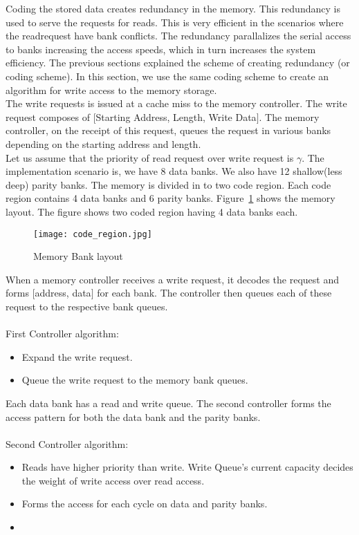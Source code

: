 Coding the stored data creates redundancy in the memory. This redundancy is used to serve the requests for reads. This is very efficient in the scenarios where the readrequest have bank conflicts. The redundancy parallalizes the serial access to banks increasing the access speeds, which in turn increases the system efficiency. The previous sections explained the scheme of creating redundancy (or coding scheme). In this section, we use the same coding scheme to create an algorithm for write access to the memory storage. \\
The write requests is issued at a cache miss to the memory controller. The write request composes of $[$Starting Address, Length, Write Data$]$. The memory controller, on the receipt of this request, queues the request in various banks depending on the starting address and length. \\
Let us assume that the priority of read request over write request is $\gamma$. 
The implementation scenario is, we have 8 data banks. We also have 12 shallow(less deep) parity banks. The memory is divided in to two code region. Each code region contains 4 data banks and 6 parity banks. Figure~\ref{fig:code_region} shows the memory layout. The figure shows two coded region having 4 data banks each. 
\begin{figure}[ht!]
\centering
\texttt{[image: code\_region.jpg]}
\caption{Memory Bank layout}
\label{fig:code_region}
\end{figure}
When a memory controller receives a write request, it decodes the request and forms $[$address, data$]$ for each bank. The controller then queues each of these request to the respective bank queues. \\
 \\
First Controller algorithm: 
\begin{itemize}
\item Expand the write request.
\item Queue the write request to the memory bank queues.
\end{itemize}
Each data bank has a read and write queue. The second controller forms the access pattern for both the data bank and the parity banks. \\
 \\
Second Controller algorithm: 
\begin{itemize}
\item Reads have higher priority than write. Write Queue's current capacity decides the weight of write access over read access. 
\item Forms the access for each cycle on data and parity banks. 
\item 
\end{itemize}
